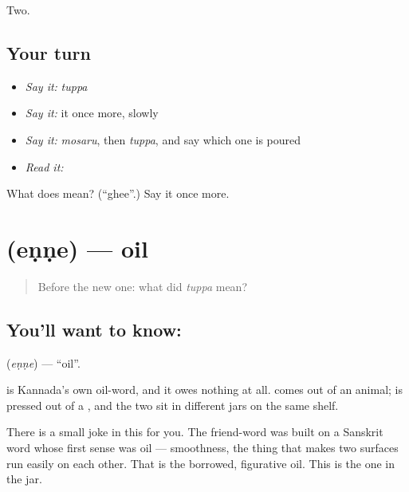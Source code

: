\begin{grammarlens}[title={What you've built}]
Two.
\end{grammarlens}

\subsection*{Your turn}
\begin{itemize}
\raggedright
  \item \emph{Say it:} \emph{tuppa}
  \item \emph{Say it:} it once more, slowly
  \item \emph{Say it:} \emph{mosaru}, then \emph{tuppa}, and say which one is poured
  \item \emph{Read it:} \textbf{}
\end{itemize}

\begin{tcolorbox}[breakable,colback=teal!4,colframe=teal!35!black,title={Before you move on}]
What does  mean? (\textquotedblleft{}ghee\textquotedblright{}.) Say it once more.
\end{tcolorbox}
\section[\texorpdfstring{\kn{ಎಣ್ಣೆ} (eṇṇe)}{ಎಣ್ಣೆ (eṇṇe)}]{ (eṇṇe) — oil}

\label{lesson:KA-C61-oil}



\begin{quote}
Before the new one: what did \emph{tuppa} mean?
\end{quote}

\subsection*{You'll want to know: }
\textbf{} (\emph{eṇṇe}) — \textquotedblleft{}oil\textquotedblright{}.

 is Kannada's own oil-word, and it owes  nothing at all.  comes out of an animal;  is pressed out of a , and the two sit in different jars on the same shelf.

There is a small joke in this for you. The friend-word  was built on a Sanskrit word whose first sense was oil — smoothness, the thing that makes two surfaces run easily on each other. That is the borrowed, figurative oil. This is the one in the jar.

